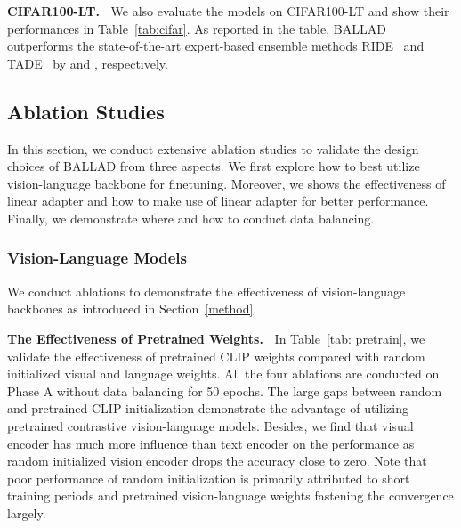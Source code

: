 \documentclass[10pt,twocolumn,letterpaper]{article}
\newcommand{\approach}{\textsc{BALLAD}}
\begin{document}
\noindent\textbf{CIFAR100-LT.~}
We also evaluate the models on CIFAR100-LT and show their performances in Table~\ref{tab:cifar}. As reported in the table, \approach{} outperforms the state-of-the-art expert-based ensemble methods RIDE~\cite{wang2021longtailed} and TADE~\cite{zhang2021test} by  and , respectively.

\subsection{Ablation Studies}
In this section, we conduct extensive ablation studies to validate the design choices of \approach{} from three aspects. We first explore how to best utilize vision-language backbone for finetuning. Moreover, we shows the effectiveness of linear adapter and how to make use of linear adapter for better performance. Finally, we demonstrate where and how to conduct data balancing.

\vspace{-6pt}
\subsubsection{Vision-Language Models}
We conduct ablations to demonstrate the effectiveness of vision-language backbones as introduced in Section~\ref{method}.

\noindent\textbf{The Effectiveness of Pretrained Weights.~}
In Table~\ref{tab: pretrain}, we validate the effectiveness of pretrained CLIP weights compared with random initialized visual and language weights. All the four ablations are conducted on Phase A without data balancing for 50 epochs. The large gaps between random and pretrained CLIP initialization demonstrate the advantage of utilizing pretrained contrastive vision-language models.
Besides, we find that visual encoder has much more influence than text encoder on the performance as random initialized vision encoder drops the accuracy close to zero. Note that poor performance of random initialization is primarily attributed to short training periods and pretrained vision-language weights fastening the convergence largely.
\end{document}
